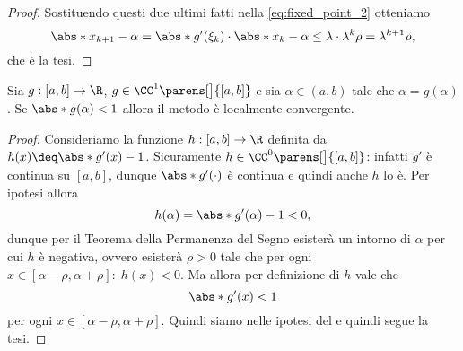 \begin{proof}
    Sostituendo questi due ultimi fatti nella \eqref{eq:fixed_point_2} otteniamo \[
        \abs*{x_{k+1} - \alpha} = \abs*{g'(\xi_k)} \cdot \abs*{x_k - \alpha} \leq \lambda \cdot \lambda^k\rho = \lambda^{k+1}\rho,
    \] che è la tesi.
\end{proof}

\begin{corollary}
    {}{}
    Sia $g : [a, b] \to \R$, $g \in \CC^1\parens[\big]{[a, b]}$ e sia $\alpha \in (a, b)$ tale che $\alpha = g(\alpha)$. Se $\abs*{g(\alpha)} < 1$ allora il metodo è localmente convergente.  
\end{corollary}
\begin{proof}
    Consideriamo la funzione $h : [a, b] \to \R$ definita da $h(x) \deq \abs*{g'(x)} - 1$. Sicuramente $h \in \CC^0\parens[\big]{[a, b]}$: infatti $g'$ è continua su $[a, b]$, dunque $\abs*{g'(\cdot)}$ è continua e quindi anche $h$ lo è. Per ipotesi allora \[
        h(\alpha) = \abs*{g'(\alpha)} - 1 < 0,
    \] dunque per il Teorema della Permanenza del Segno esisterà un intorno di $\alpha$ per cui $h$ è negativa, ovvero esisterà $\rho > 0$ tale che per ogni $x \in [\alpha - \rho, \alpha + \rho]:\; h(x) < 0$. Ma allora per definizione di $h$ vale che \[
        \abs*{g'(x)} < 1
    \] per ogni $x \in [\alpha - \rho, \alpha + \rho]$. Quindi siamo nelle ipotesi del  e quindi segue la tesi. 
\end{proof}
